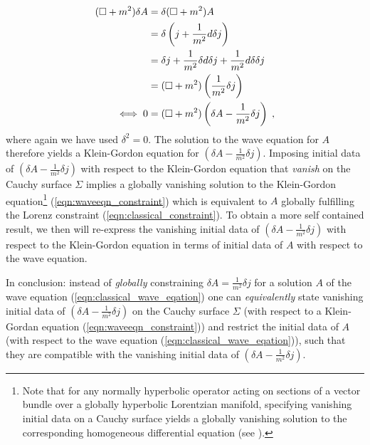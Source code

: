 \begin{align}
(\square +m^2) \delta A
 &= \delta (\square + m^2) A \notag\\
&= \delta \left( j + \frac{1}{m^2} d \delta j \right) \notag\\
&= \delta  j + \frac{1}{m^2} \delta d \delta j + \frac{1}{m^2} d \delta \delta j \notag\\
&= (\square + m^2 ) \left (\frac{1}{m^2} \delta j \right)  \notag \\
\iff 0 &= (\square + m^2 )\left (\delta A - \frac{1}{m^2} \delta j \right)   \label{eqn:waveeqn_constraint}
\;,
\end{align}
where again we have used $\delta ^2 = 0$. The solution to the wave equation for $A$ therefore yields a Klein-Gordon equation for $(\delta A - \frac{1}{m^2} \delta j)$. Imposing initial data of $(\delta A - \frac{1}{m^2} \delta j)$ with respect to the Klein-Gordon equation that \emph{vanish} on the Cauchy surface $\Sigma$ implies a globally vanishing solution to the Klein-Gordon equation\footnote{Note that for any normally hyperbolic operator acting on sections of a vector bundle over a globally hyperbolic Lorentzian manifold, specifying vanishing initial data on a Cauchy surface yields a globally vanishing solution to the corresponding homogeneous differential equation (see \cite[Corollary 3.2.4]{baer_ginoux_pfaeffle}).} (\ref{eqn:waveeqn_constraint}) which is equivalent to $A$ globally fulfilling the Lorenz constraint (\ref{eqn:classical_constraint}).
To obtain a more self contained result, we then will re-express the vanishing initial data of $(\delta A -\frac{1}{m^2} \delta j)$ with respect to the Klein-Gordon equation in terms of initial data of $A$ with respect to the wave equation.\par
In conclusion: instead of \emph{globally} constraining $\delta A = \frac{1}{m^2} \delta j$ for a solution $A$ of the wave equation (\ref{eqn:classical_wave_eqation}) one can \emph{equivalently} state vanishing initial data of $(\delta A -\frac{1}{m^2} \delta j)$ on the Cauchy surface $\Sigma$ (with respect to a Klein-Gordan equation (\ref{eqn:waveeqn_constraint})) and restrict the initial data of $A$ (with respect to the wave equation (\ref{eqn:classical_wave_eqation})), such that they are compatible with the vanishing initial data of $\left(\delta A - \frac{1}{m^2} \delta j\right)$.
%
%
%
%
\newpage

